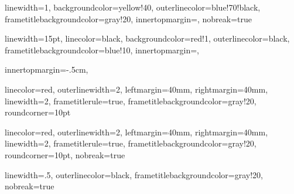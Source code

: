 \newenvironment{Declaration}{
  \chapter*{Declaration of Authorship}
  \addcontentsline{toc}{chapter}{Declaration of Authorship}
}
{
\clearpage
}

\newenvironment{acknol}{
  \chapter*{Acknoledgements}
  \setstretch{1.3}
}
{
\clearpage
}


{linewidth=1,
backgroundcolor=yellow!40,
outerlinecolor=blue!70!black,
frametitlebackgroundcolor=gray!20,
innertopmargin=\topskip,
nobreak=true}



{linewidth=15pt,
linecolor=black,
backgroundcolor=red!1,
outerlinecolor=black,
frametitlebackgroundcolor=blue!10,
innertopmargin=\topskip,}

{%
innertopmargin=-.5cm,}

{linecolor=red,
outerlinewidth=2,
leftmargin=40mm,
rightmargin=40mm,
linewidth=2,
frametitlerule=true,
frametitlebackgroundcolor=gray!20,
roundcorner=10pt}

{linecolor=red,
outerlinewidth=2,
leftmargin=40mm,
rightmargin=40mm,
linewidth=2,
frametitlerule=true,
frametitlebackgroundcolor=gray!20,
roundcorner=10pt,
nobreak=true}


{linewidth=.5,
outerlinecolor=black,
frametitlebackgroundcolor=gray!20,
nobreak=true}


